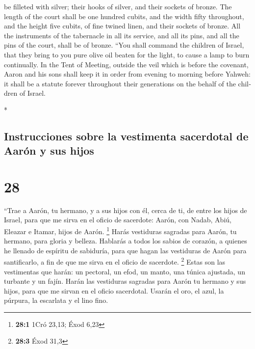 \begin{paracol}{2}
\begin{otherlanguage}{english}
be filleted with silver; their hooks of silver, and their sockets of
bronze.  The length of the court shall be one hundred
cubits, and the width fifty throughout, and the height five cubits, of
fine twined linen, and their sockets of bronze.  All the
instruments of the tabernacle in all its service, and all its pins, and
all the pins of the court, shall be of bronze.  ``You
shall command the children of Israel, that they bring to you pure olive
oil beaten for the light, to cause a lamp to burn continually.
 In the Tent of Meeting, outside the veil which is before
the covenant, Aaron and his sons shall keep it in order from evening to
morning before Yahweh: it shall be a statute forever throughout their
generations on the behalf of the children of Israel.

\end{otherlanguage}

\switchcolumn[0]*

\hypertarget{instrucciones-sobre-la-vestimenta-sacerdotal-de-aaruxf3n-y-sus-hijos}{%
\subsection{Instrucciones sobre la vestimenta sacerdotal de Aarón y sus
hijos}\label{instrucciones-sobre-la-vestimenta-sacerdotal-de-aaruxf3n-y-sus-hijos}}

\hypertarget{section-54}{%
\section{28}\label{section-54}}

 ``Trae a Aarón, tu hermano, y a sus hijos con él, cerca
de ti, de entre los hijos de Israel, para que me sirva en el oficio de
sacerdote: Aarón, con Nadab, Abiú, Eleazar e Itamar, hijos de Aarón.
\footnote{\textbf{28:1} 1Cró 23,13; Éxod 6,23}  Harás
vestiduras sagradas para Aarón, tu hermano, para gloria y belleza.
 Hablarás a todos los sabios de corazón, a quienes he
llenado de espíritu de sabiduría, para que hagan las vestiduras de Aarón
para santificarlo, a fin de que me sirva en el oficio de sacerdote.
\footnote{\textbf{28:3} Éxod 31,3}  Estas son las
vestimentas que harán: un pectoral, un efod, un manto, una túnica
ajustada, un turbante y un fajín. Harán las vestiduras sagradas para
Aarón tu hermano y sus hijos, para que me sirvan en el oficio
sacerdotal.  Usarán el oro, el azul, la púrpura, la
escarlata y el lino fino.


\end{paracol}

